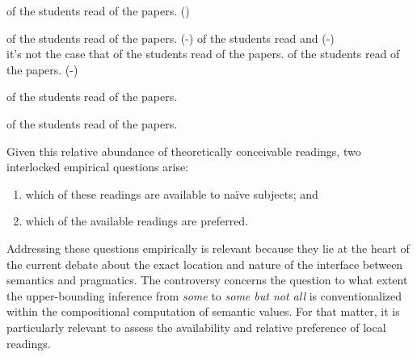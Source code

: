 \documentclass[fleqn,reqno,10pt,draft]{article}
\newcommand{\lit}{\acro{lit}}
\newcommand{\glb}{\acro{glb}}
\newcommand{\loc}{\acro{loc}}
\renewcommand{\es}{\acro{es}}
\begin{document}
\begin{exe}
\ex  \label{bsp:GE}  of the students read {} of the
  papers. \hfill{(\es)}

  \begin{xlist}
  \ex \label{bsp:GE-Literal}  of the students read
    {} of the papers. \hfill (\es-\lit)
  \ex \label{bsp:GE-Global}
     of the students read  
    and  \hfill (\es-\glb)\\
    it's not the case that  of the students read  of the papers.
  \ex \label{bsp:GE-Local}
     of the students read {} of the
    papers. \hfill (\es-\loc)
  \end{xlist}
\end{exe}


\begin{exe}
\ex \label{bsp:AE-Alternative}  of the students read
  {} of the papers. 

\ex \label{bsp:GE-Alternative}  of the students
  read {} of the papers.
\end{exe}


\noindent Given this relative abundance of theoretically conceivable
readings, two interlocked empirical questions arise:
\begin{enumerate}[Q1:]
\item which of these readings are available to na\"{i}ve subjects; and
\item which of the available readings are preferred.
\end{enumerate}
Addressing these questions empirically is relevant because they lie at
the heart of the current debate about the exact location and nature of
the interface between semantics and pragmatics. The controversy
concerns the question to what extent the upper-bounding inference from
\emph{some} to \emph{some but not all} is conventionalized within the
compositional computation of semantic values. For that matter, it is
particularly relevant to assess the availability and relative
preference of local readings. %
\end{document}
